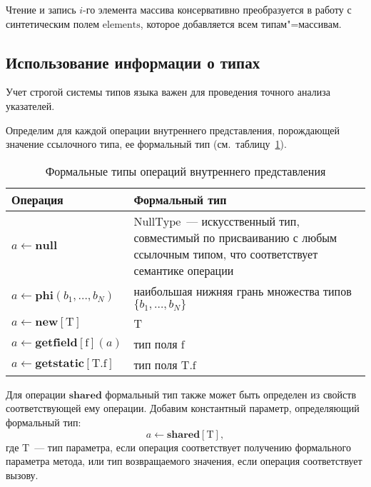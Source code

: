 \documentclass[14pt,titlepage,draft]{extarticle}
\newcommand{\java}{\eng{Java}\xspace}
\newcommand{\type}[1]{\mathrm{#1}}
\newcommand{\field}[1]{\mathrm{#1}}
\newcommand{\sfield}[2]{\type{#1}.\field{#2}}
\newcommand{\op}[1]{\mathbf{#1}}
\begin{document}
    Чтение и запись $i$-го элемента массива консервативно преобразуется в
    работу с синтетическим полем $\field{elements}$, которое добавляется всем
    типам"=массивам.

  \subsection{Использование информации о типах}

    Учет строгой системы типов языка \java важен для проведения точного анализа
    указателей.

    Определим для каждой операции внутреннего представления, порождающей
    значение ссылочного типа, ее формальный тип
    (см.~таблицу~\ref{tabular:ops_types}).

    \begin{table}[htb]
      \centering

      \begin{tabular}{|p{}|p{}|}\hline
        \textbf{Операция} &
          \textbf{Формальный тип}\\ \hline

        $a \gets \op{null}$
        & $\type{NullType}$~--- искусственный тип, совместимый по
          присваиванию с любым ссылочным типом, что соответствует
          семантике операции
        \\ \hline

        $a \gets \op{phi}(b_1, \ldots, b_N)$
        & наибольшая нижняя грань множества типов $\{b_1, \ldots, b_N\}$
        \\ \hline

        $a \gets \op{new}[\type{T}]$
        & T
        \\ \hline

        $a \gets \op{getfield}[\field{f}](a)$
        & тип поля $\field{f}$
        \\ \hline

        $a \gets \op{getstatic}[\sfield{T}{f}]$
        & тип поля $\sfield{T}{f}$
        \\ \hline

      \end{tabular}
      \caption{Формальные типы операций внутреннего представления}
      \label{tabular:ops_types}
    \end{table}

    Для операции $\op{shared}$ формальный тип также может быть определен из
    свойств соответствующей ему \java операции.
    Добавим константный параметр, определяющий формальный тип:
    \[a \gets \op{shared}[\type{T}],\]
    где $\type{T}$~--- тип параметра, если операция соответствует
    получению формального параметра метода, или тип возвращаемого значения,
    если операция соответствует вызову.
\end{document}
